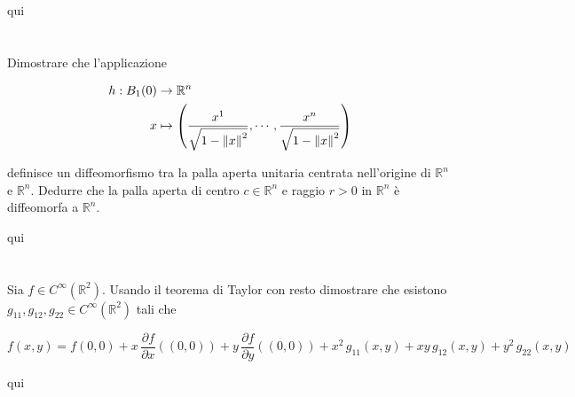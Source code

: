 qui

\tocless\section{}\label{es1-4}

\begin{tcolorbox}
	Dimostrare che l'applicazione
	
	\begin{align}
		\begin{split}
			h : B_{1} (0) &\to \mathbb{R}^{n}\\
			x &\mapsto \left( \dfrac{x^{1}}{\sqrt{1 - \norm{x}^{2}}}, \cdots, \dfrac{x^{n}}{\sqrt{1 - \norm{x}^{2}}} \right)
		\end{split}	
	\end{align}
	
	definisce un diffeomorfismo tra la palla aperta unitaria centrata nell'origine di $ \mathbb{R}^{n} $ e $ \mathbb{R}^{n} $. Dedurre che la palla aperta di centro $ c \in \mathbb{R}^{n} $ e raggio $ r>0 $ in $ \mathbb{R}^{n} $ è diffeomorfa a $ \mathbb{R}^{n} $.
\end{tcolorbox}

qui

\tocless\section{}\label{es1-5}

\begin{tcolorbox}
	Sia $ f \in C^{\infty}(\mathbb{R}^{2}) $. Usando il teorema di Taylor con resto dimostrare che esistono $ g_{11},g_{12},g_{22} \in C^{\infty}(\mathbb{R}^{2}) $ tali che
	
	\begin{equation}
		f(x,y) = f(0,0) + x \, \dfrac{\partial f}{\partial x} ((0,0)) + y \, \dfrac{\partial f}{\partial y} ((0,0)) + x^{2} \, g_{11}(x,y) + xy \, g_{12}(x,y) + y^{2} \, g_{22}(x,y)
	\end{equation}
\end{tcolorbox}

qui

\tocless\section{}\label{es1-6}

